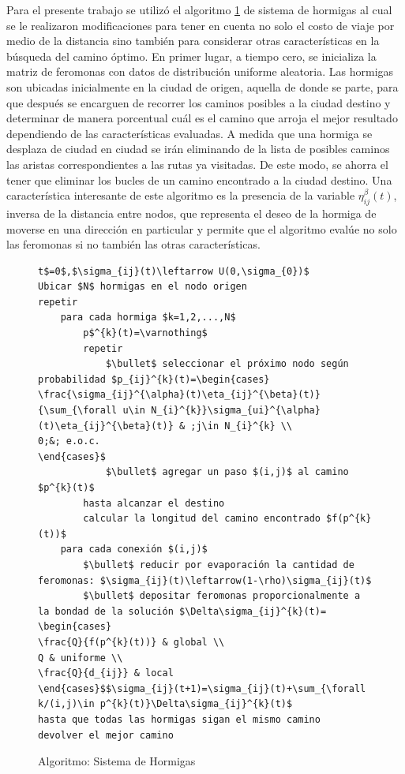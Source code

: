 \documentclass[conference,a4paper,10pt,oneside,final]{tfmpd}
\begin{document}
Para el presente trabajo se utilizó el algoritmo \ref{fig:AS} de sistema de hormigas al cual se le realizaron modificaciones para tener en cuenta no solo el costo de viaje por medio de la distancia sino también para considerar otras características en la búsqueda del camino óptimo.
En primer lugar, a tiempo cero, se inicializa la matriz de feromonas con datos de distribución uniforme aleatoria. Las hormigas son ubicadas inicialmente en la ciudad de origen, aquella de donde se parte, para que después se encarguen de recorrer los caminos posibles a la ciudad destino y determinar de manera porcentual cuál es el camino que arroja el mejor resultado dependiendo de las características evaluadas. A medida que una hormiga se desplaza de ciudad en ciudad se irán eliminando de la lista de posibles caminos las aristas correspondientes a las rutas ya visitadas. De este modo, se ahorra el tener que eliminar los bucles de un camino encontrado a la ciudad destino. Una característica interesante de este algoritmo es la presencia de la variable $\eta_{ij}^{\beta}(t)$, inversa de la distancia entre nodos, que representa el deseo de la hormiga de moverse en una dirección en particular y permite que el algoritmo evalúe no solo las feromonas si no también las otras características.

\begin{figure}[!h]
\begin{lstlisting}[mathescape=true]
t$=0$,$\sigma_{ij}(t)\leftarrow U(0,\sigma_{0})$
Ubicar $N$ hormigas en el nodo origen
repetir
	para cada hormiga $k=1,2,...,N$
		p$^{k}(t)=\varnothing$
		repetir
			$\bullet$ seleccionar el próximo nodo según probabilidad $p_{ij}^{k}(t)=\begin{cases}
\frac{\sigma_{ij}^{\alpha}(t)\eta_{ij}^{\beta}(t)}{\sum_{\forall u\in N_{i}^{k}}\sigma_{ui}^{\alpha}(t)\eta_{ij}^{\beta}(t)} & ;j\in N_{i}^{k} \\
0;&; e.o.c.
\end{cases}$
			$\bullet$ agregar un paso $(i,j)$ al camino $p^{k}(t)$
		hasta alcanzar el destino
		calcular la longitud del camino encontrado $f(p^{k}(t))$
	para cada conexión $(i,j)$
		$\bullet$ reducir por evaporación la cantidad de feromonas: $\sigma_{ij}(t)\leftarrow(1-\rho)\sigma_{ij}(t)$
		$\bullet$ depositar feromonas proporcionalmente a la bondad de la solución $\Delta\sigma_{ij}^{k}(t)=
\begin{cases} 
\frac{Q}{f(p^{k}(t))} & global \\
Q & uniforme \\
\frac{Q}{d_{ij}} & local
\end{cases}$$\sigma_{ij}(t+1)=\sigma_{ij}(t)+\sum_{\forall k/(i,j)\in p^{k}(t)}\Delta\sigma_{ij}^{k}(t)$
hasta que todas las hormigas sigan el mismo camino
devolver el mejor camino
\end{lstlisting}
\caption{Algoritmo: Sistema de Hormigas}
\label{fig:AS}
\end{figure}
\end{document}
